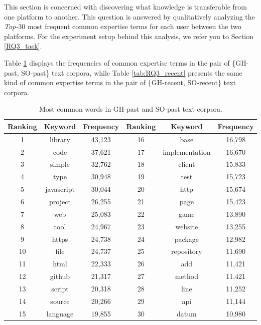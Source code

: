         This section is concerned with discovering what knowledge is transferable from one platform to another. This question is answered by qualitatively analyzing the \emph{Top-$30$} most frequent common expertise terms for each user between the two platforms. For the experiment setup behind this analysis, we refer you to Section \ref{RQ3_task}.
        
        Table \ref{tab:RQ3_past} displays the frequencies of common expertise terms in the pair of \{GH-past, SO-past\} text corpora, while Table \ref{tab:RQ3_recent} presents the same kind of common expertise terms in the pair of \{GH-recent, SO-recent\} text corpora.
        
        \begin{table}
          \centering
          \caption{Most common words in GH-past and SO-past text corpora.}\label{tab:RQ3_past}
            \vspace{6pt} %
          \begin{tabular}{|c c c | c c c|}
            \hline
            Ranking & Keyword & Frequency & Ranking & Keyword & Frequency \\
            \hline\hline
            1 & library & 43,123 & 16 & base & 16,798 \\
            2 & code & 37,621 & 17 & implementation & 16,670 \\
            3 & simple & 32,762 & 18 & client & 15,833 \\
            4 & type & 30,948 & 19 & test & 15,723 \\
            5 & javascript & 30,044 & 20 & http & 15,674 \\
            6 & project & 26,255 & 21 & page & 15,423 \\
            7 & web & 25,083 & 22 & game & 13,890 \\
            8 & tool & 24,967 & 23 & website & 13,255 \\
            9 & https & 24,738 & 24 & package & 12,982 \\
            10 & file & 24,737 & 25 & repository & 11,690 \\
            11 & html & 22,333 & 26 & add & 11,421 \\
            12 & github & 21,317 & 27 & method & 11,421 \\
            13 & script & 20,318 & 28 & line & 11,252 \\
            14 & source & 20,266 & 29 & api & 11,144 \\
            15 & language & 19,855 & 30 & datum & 10,980 \\
            \hline
          \end{tabular}
        \end{table}
        
